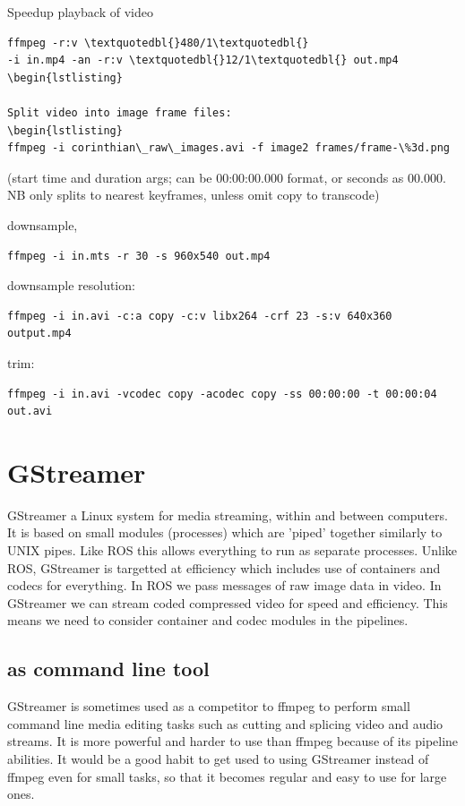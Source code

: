 \documentclass[oneside,english]{scrbook}
\begin{document}
Speedup playback of video 
\begin{lstlisting}
ffmpeg -r:v \textquotedbl{}480/1\textquotedbl{}
-i in.mp4 -an -r:v \textquotedbl{}12/1\textquotedbl{} out.mp4
\begin{lstlisting}

Split video into image frame files: 
\begin{lstlisting}
ffmpeg -i corinthian\_raw\_images.avi -f image2 frames/frame-\%3d.png 
\end{lstlisting}
(start time and duration args; can be 00:00:00.000 format, or seconds as 00.000. NB only splits to nearest keyframes, unless omit copy to transcode)

downsample,
\begin{lstlisting}
ffmpeg -i in.mts -r 30 -s 960x540 out.mp4
\end{lstlisting}

downsample resolution: 
\begin{lstlisting}
ffmpeg -i in.avi -c:a copy -c:v libx264 -crf 23 -s:v 640x360 output.mp4
\end{lstlisting}

trim:
\begin{lstlisting}
ffmpeg -i in.avi -vcodec copy -acodec copy -ss 00:00:00 -t 00:00:04 out.avi
\end{lstlisting}



\chapter{GStreamer}

GStreamer a Linux system for media streaming, within and between computers. It is based on small modules (processes) which are 'piped' together similarly to UNIX pipes.  Like ROS this allows everything to run as separate processes. Unlike ROS, GStreamer is targetted at efficiency which includes use of containers and codecs for everything. In ROS we pass messages of raw image data in video. In GStreamer we can stream coded compressed video for speed and efficiency.  This means we need to consider container and codec modules in the pipelines.

\section{as command line tool}

GStreamer is sometimes used as a competitor to ffmpeg to perform small command line media editing tasks such as cutting and splicing video and audio streams. It is more powerful and harder to use than ffmpeg because of its pipeline abilities.  It would be a good habit to get used to using GStreamer instead of ffmpeg even for small tasks, so that it becomes regular and easy to use for large ones.
\end{document}
